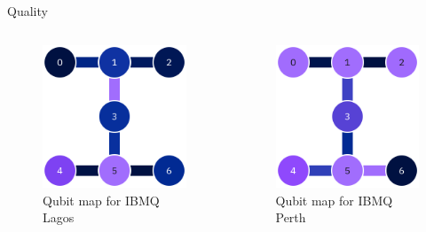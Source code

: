 \documentclass{beamer}
\begin{document}
\begin{frame}{Quality}
    \begin{columns}
        \begin{figure}
            \centering
            \includegraphics[width=0.7\columnwidth]{images/ibm_lagos_calibrations_readout_error_cx_map_2023-07-14T14_39_24Z.png}
            \caption{Qubit map for IBMQ Lagos}
            \label{fig:lagos}
        \end{figure}
        \begin{figure}
            \centering
            \includegraphics[width=0.7\columnwidth]{images/ibm_perth_calibrations_readout_error_cx_map_2023-07-14T14_39_08Z.png}
            \caption{Qubit map for IBMQ Perth}
            \label{fig:quito}
        \end{figure}
    \end{columns}
\end{frame}
\end{document}
